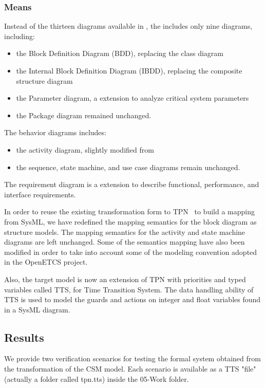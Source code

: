 \subsubsection{Means}
Instead of the thirteen diagrams available in , the \sysml
includes only nine diagrams, including:
\begin{itemize}
\item
the Block Definition Diagram (BDD), replacing the  class diagram
\item
the Internal Block Definition Diagram (IBDD), replacing the  composite structure diagram
\item
the Parameter diagram, a \sysml extension to analyze critical system parameters
\item
the Package diagram remained unchanged. 
\end{itemize}

The behavior diagrams includes:
\begin{itemize}
\item
the activity diagram, slightly modified from 
\item
the sequence, state machine, and use case diagrams remain unchanged. 
\end{itemize}

The requirement diagram is a \sysml extension to describe functional, performance, and interface requirements.	

In order to reuse the existing transformation form \uml to
TPN~\cite{Ge2014} to build a mapping from SysML, we have redefined the
mapping semantics for the block diagram as structure models. The
mapping semantics for the activity and state machine diagrams are left
unchanged. Some of the semantics mapping have also been modified in
order to take into account some of the modeling convention adopted in
the OpenETCS project.

Also, the target model is now an extension of  TPN with
priorities and typed variables called TTS, for Time Transition
System. The data handling ability of TTS is used to model the guards
and actions on integer and float variables found in a SysML diagram.


\subsection{Results}

We provide two verification scenarios for testing the formal system
obtained from the transformation of the CSM model. Each scenario is
available as a TTS "file" (actually a folder called tpn.tts) inside
the 05-Work folder.

